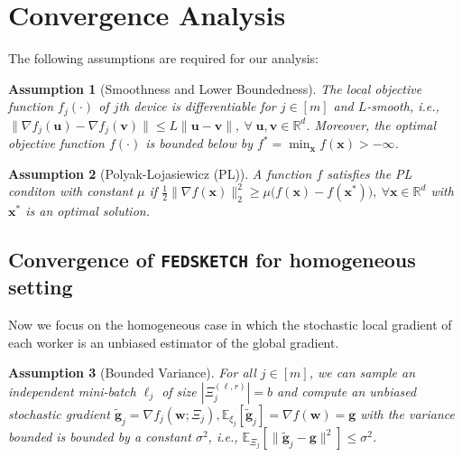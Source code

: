 \documentclass{article}
\newtheorem{assumption}{Assumption}
\begin{document}
\section{Convergence Analysis}\label{sec:analysis}
The following assumptions are required for our analysis:
\begin{assumption}[Smoothness and Lower Boundedness]\label{Assu:1}
The local objective function $f_j(\cdot)$ of $j$th device is differentiable for $j\in [m]$ and $L$-smooth, i.e., $\|\nabla f_j(\boldsymbol{u})-\nabla f_j(\mathbf{v})\|\leq L\|\boldsymbol{u}-\mathbf{v}\|,\: \forall \;\boldsymbol{u},\mathbf{v}\in\mathbb{R}^d$. Moreover, the optimal objective function $f(\cdot)$ is bounded below by ${f^*} = \min_{\boldsymbol{x}} f(\boldsymbol{x})>-\infty$. 
\end{assumption}
\begin{assumption}[Polyak-Lojasiewicz (PL)]\label{assum:pl}
A function $f$  satisfies the PL conditon with constant $\mu$ if $\frac{1}{2}\|\nabla f(\boldsymbol{x})\|_2^2\geq \mu\big(f(\boldsymbol{x})-f(\boldsymbol{x}^*)\big),\: \forall \boldsymbol{x}\in\mathbb{R}^d $ with $\boldsymbol{x}^*$ is an optimal solution.
\end{assumption}


\subsection{Convergence of \texttt{FEDSKETCH} for homogeneous setting}
Now we focus on the homogeneous case in which the stochastic local gradient of each worker is an unbiased estimator of the global gradient.


\begin{assumption}[Bounded Variance]\label{Assu:1.5}
For all $j\in [m]$, we can sample an independent mini-batch $\ell_j$   of size $|\Xi_j^{(\ell,r)}| = b$ and compute an unbiased stochastic gradient  $\tilde{\mathbf{g}}_j = \nabla f_j(\boldsymbol{w}; \Xi_j), \mathbb{E}_{\xi_j}[\tilde{\mathbf{g}}_j] = \nabla f(\boldsymbol{w})=\mathbf{g}$ with  the variance bounded is bounded by a constant $\sigma^2$, i.e., $
\mathbb{E}_{\Xi_j}\left[\|\tilde{\mathbf{g}}_j-\mathbf{g}\|^2\right]\leq \sigma^2$.
\end{assumption}
\end{document}
